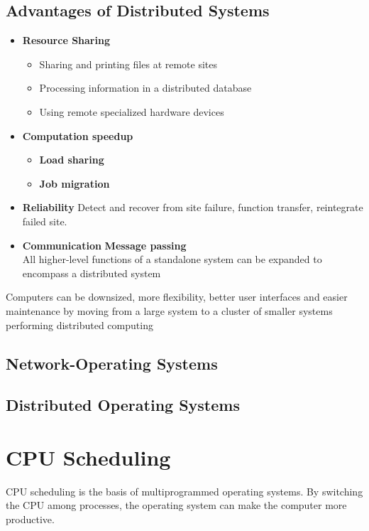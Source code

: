 \documentclass[oneside]{book}
\begin{document}
        \section{Advantages of Distributed Systems}
            \begin{itemize}
                \item \textbf{Resource Sharing}
                    \begin{itemize}
                        \item Sharing and printing files at remote sites
                        \item Processing information in a distributed database
                        \item Using remote specialized hardware devices
                    \end{itemize}
                \item \textbf{Computation speedup}
                    \begin{itemize}
                        \item \textbf{Load sharing}
                        \item \textbf{Job migration}
                    \end{itemize}
                \item \textbf{Reliability}
                    \subitem Detect and recover from site failure, function transfer,
                    reintegrate failed site.
                \item \textbf{Communication}
                    \subitem \textbf{Message passing}\\
                    \indent \indent All higher-level functions of a standalone system can
                    be expanded to encompass a distributed system
            \end{itemize}
            Computers can be downsized, more flexibility, better user interfaces and easier
            maintenance by moving from a large system to a cluster of smaller systems performing
            distributed computing
        \section{Network-Operating Systems}
        \section{Distributed Operating Systems}
    \chapter{CPU Scheduling}
        CPU scheduling is the basis of multiprogrammed operating systems.
        By switching the CPU among processes, the operating system can make the
        computer more productive.
\end{document}
